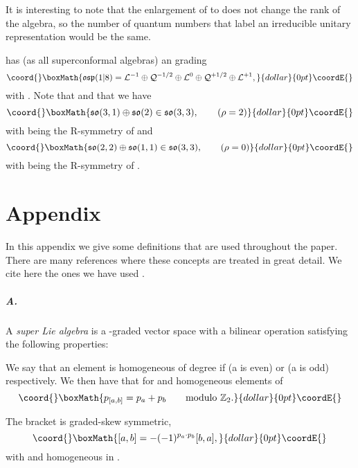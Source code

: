 \documentclass[a4paper,12pt]{article}
\begin{document}
It is interesting to note that the enlargement of
\coordHE{} to \coordHE{} does not change the rank
of the algebra, so the number of  quantum numbers that label an
irreducible unitary representation would be the same.

\coordHE{} has (as all superconformal algebras) an \coordHE{}
grading
$$\coord{}\boxMath{\fosp(1|8)=\La^{-1}\oplus\Qa^{-1/2}\oplus\La^{0}\oplus\Qa^{+1/2}\oplus\La^{+1},}{dollar}{0pt}\coordE{}$$
with \coordHE{}. Note that
\coordHE{} and that we have
$$\coord{}\boxMath{\fso(3,1)\oplus\fso(2)\in \fso(3,3), \qquad (\rho=2)}{dollar}{0pt}\coordE{}$$ with
\coordHE{} being the R-symmetry of \coordHE{} and
$$\coord{}\boxMath{\fso(2,2)\oplus\fso(1,1)\in \fso(3,3), \qquad (\rho=0)}{dollar}{0pt}\coordE{}$$ with
\coordHE{} being the R-symmetry of \coordHE{}.

\section*{Appendix}
In this appendix we give some definitions that are used throughout
the paper. There are many references where these concepts are
treated in great detail. We cite here the ones we have used
\cite{be,ko,ka,le}.

\subparagraph{A.} A {\it super Lie algebra} is a \coordHE{}-graded
vector space \coordHE{} with a bilinear operation
\myHighlight{$[\;,\;]:\fg\times\fg\rightarrow\fg$}\coordHE{} satisfying the following
properties:

\smallskip

 We say that an element \coordHE{} is
homogeneous of degree \coordHE{} if \coordHE{} (a is even) or
\coordHE{} (a is odd) respectively. We then have that for \coordHE{}
and \coordHE{} homogeneous elements of \myHighlight{$\fg$}\coordHE{}  $$\coord{}\boxMath{p_{[a,b]}=p_a+p_b\qquad
\hbox{modulo } \Z_2.}{dollar}{0pt}\coordE{}$$


\smallskip

 The bracket is graded-skew symmetric,
$$\coord{}\boxMath{[a,b]=-(-1)^{p_a\cdot p_b}[b,a],}{dollar}{0pt}\coordE{}$$ with \coordHE{} and \coordHE{} homogeneous
in \myHighlight{$\fg$}\coordHE{}.
\end{document}
